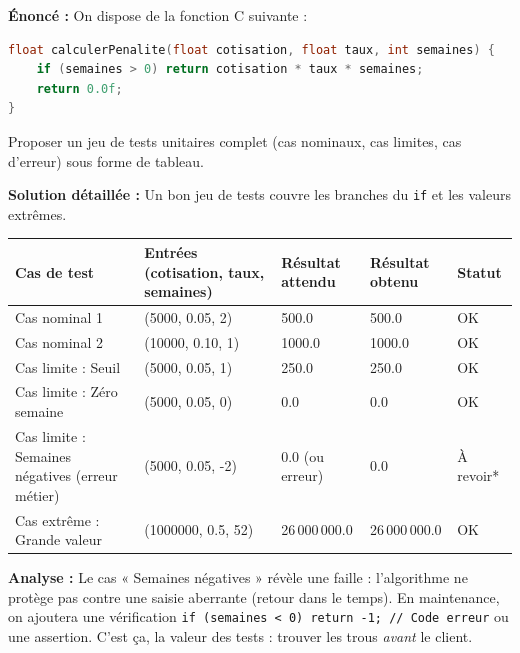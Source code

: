 \documentclass[11pt]{article}
\begin{document}
\begin{exoresolu}
\textbf{Énoncé :} On dispose de la fonction C suivante :
\begin{lstlisting}[language=C]
float calculerPenalite(float cotisation, float taux, int semaines) {
    if (semaines > 0) return cotisation * taux * semaines;
    return 0.0f;
}
\end{lstlisting}
Proposer un jeu de tests unitaires complet (cas nominaux, cas limites, cas d'erreur) sous forme de tableau.

\textbf{Solution détaillée :}
Un bon jeu de tests couvre les branches du \texttt{if} et les valeurs extrêmes.

\begin{center}
\begin{tabularx}{\linewidth}{|l|X|X|X|X|}
\hline
\rowcolor{popblueL}
\textbf{Cas de test} & \textbf{Entrées (cotisation, taux, semaines)} & \textbf{Résultat attendu} & \textbf{Résultat obtenu} & \textbf{Statut} \\
\hline
Cas nominal 1 & (5000, 0.05, 2) & 500.0 & 500.0 & \textcolor{popgreen}{OK} \\
\hline
Cas nominal 2 & (10000, 0.10, 1) & 1000.0 & 1000.0 & \textcolor{popgreen}{OK} \\
\hline
Cas limite : Seuil & (5000, 0.05, 1) & 250.0 & 250.0 & \textcolor{popgreen}{OK} \\
\hline
Cas limite : Zéro semaine & (5000, 0.05, 0) & 0.0 & 0.0 & \textcolor{popgreen}{OK} \\
\hline
Cas limite : Semaines négatives (erreur métier) & (5000, 0.05, -2) & 0.0 (ou erreur) & 0.0 & \textcolor{poporange}{À revoir*} \\
\hline
Cas extrême : Grande valeur & (1000000, 0.5, 52) & 26\,000\,000.0 & 26\,000\,000.0 & \textcolor{popgreen}{OK} \\
\hline
\end{tabularx}
\end{center}
\textbf{Analyse :} Le cas « Semaines négatives » révèle une faille : l'algorithme ne protège pas contre une saisie aberrante (retour dans le temps). En maintenance, on ajoutera une vérification \texttt{if (semaines < 0) return -1; // Code erreur} ou une assertion. C'est ça, la valeur des tests : trouver les trous \emph{avant} le client.
\end{exoresolu}
\end{document}
